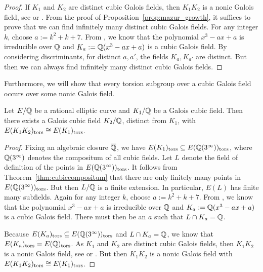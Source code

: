 \begin{proof}
If $K_1$ and $K_2$ are distinct cubic Galois fields, then $K_1K_2$ is a nonic Galois field, see \cite[Ch.~14,Prop.~21]{dummitfoote} or \cite[VI,\S1,Thm.~1.14]{lang93}. From the proof of Proposition~\ref{prop:mazur_growth}, it suffices to prove that we can find infinitely many distinct cubic Galois fields. For any integer $k$, choose $a:= k^2 + k + 7$. From \cite[Cor.~2.5]{conradcubic}, we know that the polynomial $x^3 - ax + a$ is irreducible over $\mathbb{Q}$ and $K_a:= \mathbb{Q}(x^3 - ax + a)$ is a cubic Galois field. By considering discriminants, for distinct $a,a'$, the fields $K_a, K_{a'}$ are distinct. But then we can always find infinitely many distinct cubic Galois fields. 
\end{proof}


Furthermore, we will show that every torsion subgroup over a cubic Galois field occurs over some nonic Galois field. 


\begin{thm} \label{thm:noniccubicext}
Let $E/\mathbb{Q}$ be a rational elliptic curve and $K_1/\mathbb{Q}$ be a Galois cubic field. Then there exists a Galois cubic field $K_2/\mathbb{Q}$, distinct from $K_1$, with $E(K_1K_2)_{\text{tors}} \cong E(K_1)_{\text{tors}}$. 
\end{thm}

\begin{proof} 
Fixing an algebraic closure $\overline{\mathbb{Q}}$, we have $E(K_1)_{\text{tors}} \subseteq E(\mathbb{Q}(3^\infty))_{\text{tors}}$, where $\mathbb{Q}(3^\infty)$ denotes the compositum of all cubic fields. Let $L$ denote the field of definition of the points in $E(\mathbb{Q}(3^\infty))_{\text{tors}}$. It follows from Theorem~\ref{thm:cubiccompositum} that there are only finitely many points in $E(\mathbb{Q}(3^\infty))_{\text{tors}}$. But then $L/\mathbb{Q}$ is a finite extension. In particular, $E(L)$ has finite many subfields. Again for any integer $k$, choose $a:= k^2 + k + 7$. From \cite[Cor.~2.5]{conradcubic}, we know that the polynomial $x^3 - ax + a$ is irreducible over $\mathbb{Q}$ and $K_a:= \mathbb{Q}(x^3 - ax + a)$ is a cubic Galois field. There must then be an $a$ such that $L \cap K_a= \mathbb{Q}$. 

Because $E(K_a)_{\text{tors}} \subseteq E(\mathbb{Q}(3^\infty))_{\text{tors}}$ and $L \cap K_a= \mathbb{Q}$, we know that $E(K_a)_{\text{tors}}= E(\mathbb{Q})_{\text{tors}}$. As $K_1$ and $K_2$ are distinct cubic Galois fields, then $K_1K_2$ is a nonic Galois field, see \cite[Ch.~14,Prop.~21]{dummitfoote} or \cite[VI,\S1,Thm.~1.14]{lang93}. But then $K_1K_2$ is a nonic Galois field with $E(K_1K_2)_{\text{tors}} \cong E(K_1)_{\text{tors}}$.
\end{proof} 


